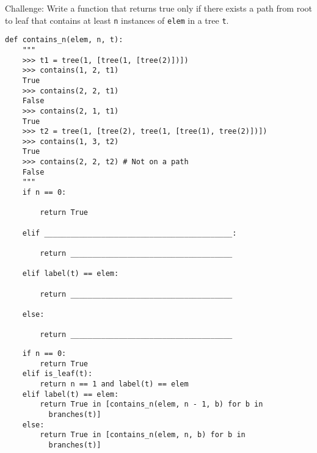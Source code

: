 \begin{blocksection}
\question Challenge: Write a function that returns true only if there exists a path from root to leaf that contains at least \lstinline$n$ instances of \lstinline$elem$ in a tree \lstinline$t$.

\begin{lstlisting}
def contains_n(elem, n, t):
    """
    >>> t1 = tree(1, [tree(1, [tree(2)])])
    >>> contains(1, 2, t1)
    True
    >>> contains(2, 2, t1)
    False
    >>> contains(2, 1, t1)
    True
    >>> t2 = tree(1, [tree(2), tree(1, [tree(1), tree(2)])])
    >>> contains(1, 3, t2)
    True
    >>> contains(2, 2, t2) # Not on a path
    False
    """
    if n == 0:

        return True

    elif ___________________________________________:

        return _____________________________________

    elif label(t) == elem:

        return _____________________________________

    else:

        return _____________________________________
\end{lstlisting}
\end{blocksection}

\begin{blocksection}
\begin{solution}
\begin{lstlisting}
    if n == 0:
        return True
    elif is_leaf(t):
        return n == 1 and label(t) == elem
    elif label(t) == elem:
        return True in [contains_n(elem, n - 1, b) for b in     
          branches(t)]
    else:
        return True in [contains_n(elem, n, b) for b in 
          branches(t)]
\end{lstlisting}
\end{solution}
\end{blocksection}



